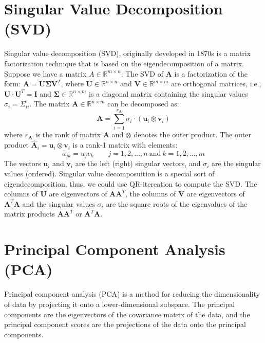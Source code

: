 \documentclass{article}[11pt]
\def\R{\mathbb{R}}
\begin{document}
\section{Singular Value Decomposition (SVD)}
Singular value decomposition (SVD), originally developed in 1870s \citep{Stewart:1993} is a matrix factorization technique that is based on the eigendecomposition of a matrix.
Suppose we have a matrix $A \in \R^{m \times n}$. The SVD of $\mathbf{A}$ is a factorization of the form: $\mathbf{A} = \mathbf{U}\mathbf{\Sigma}\mathbf{V}^{T}$, where
$\mathbf{U}\in\mathbb{R}^{n\times{n}}$ and $\mathbf{V}\in\mathbb{R}^{m\times{m}}$ are orthogonal matrices, i.e., $\mathbf{U}\cdot\mathbf{U}^{T} = \mathbf{I}$ and $\mathbf{\Sigma}\in\mathbb{R}^{n\times{m}}$ is a diagonal matrix containing 
the singular values $\sigma_{i}=\Sigma_{ii}$. The matrix $\mathbf{A}\in\mathbb{R}^{n\times{m}}$ can be decomposed as:
\begin{equation*}
\mathbf{A} = \sum_{i=1}^{r_{\mathbf{A}}}\sigma_{i}\cdot\left(\mathbf{u}_{i}\otimes\mathbf{v}_{i}\right)
\end{equation*}
where $r_{\mathbf{A}}$ is the rank of matrix $\mathbf{A}$ and $\otimes$ denotes the outer product. 
The outer product $\hat{\mathbf{A}}_{i} = \mathbf{u}_{i}\otimes\mathbf{v}_{i}$ is a rank-1 matrix with elements: 
\begin{equation*}
\hat{a}_{jk} = u_{j}v_{k}\qquad{j=1,2,\dots,n~\text{and}~k=1,2,\dots,m}
\end{equation*}
The vectors $\mathbf{u}_{i}$ and $\mathbf{v}_{i}$ are the left (right) singular vectors, 
and $\sigma_{i}$ are the singular values (ordered). Singular value decomposuition is a special sort of eigendecomposition, thus, we could use QR-itereation to compute the SVD.
The columns of $\mathbf{U}$ are eigenvectors of $\mathbf{A}\mathbf{A}^{T}$, 
the columns of $\mathbf{V}$ are eigenvectors of $\mathbf{A}^{T}\mathbf{A}$ and
the singular values $\sigma_{i}$ are the square roots of the eigenvalues of the matrix products $\mathbf{A}\mathbf{A}^{T}$ or $\mathbf{A}^{T}\mathbf{A}$. 

\section{Principal Component Analysis (PCA)}
Principal component analysis (PCA) is a method for reducing the dimensionality of data by projecting it onto a lower-dimensional subspace.
The principal components are the eigenvectors of the covariance matrix of the data, and the principal component scores are the projections of the data onto the principal components.
\end{document}
